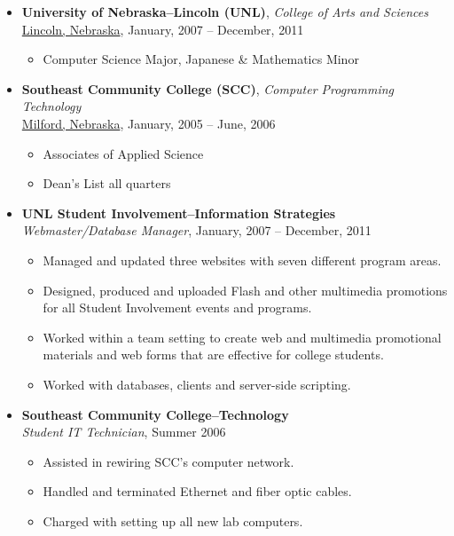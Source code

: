 \documentclass[12pt]{report}
\begin{document}
\begin{center}
\noindent\parbox{6.5in}{{\small

\begin{itemize}
\item\textbf{University of Nebraska--Lincoln (UNL)}, \textit{College of Arts and Sciences}\\
\underline{Lincoln, Nebraska}, January, 2007 -- December, 2011
\begin{itemize}
\item Computer Science Major, Japanese \& Mathematics Minor
\end{itemize}
\item\textbf{Southeast Community College (SCC)}, \textit{Computer Programming Technology}\\
\underline{Milford, Nebraska}, January, 2005 -- June, 2006
\begin{itemize}
\item Associates of Applied Science
\item Dean's List all quarters
\end{itemize}
\end{itemize}

\begin{itemize}
\item\textbf{UNL Student Involvement--Information Strategies}\\
\textit{Webmaster/Database Manager}, January, 2007 -- December, 2011
\begin{itemize}
\item Managed and updated three websites with seven different program areas.
\item Designed, produced and uploaded Flash and other multimedia promotions for all Student Involvement events and programs.
\item Worked within a team setting to create web and multimedia promotional materials and web forms that are effective for college students.
\item Worked with databases, clients and server-side scripting.
\end{itemize}
\item\textbf{Southeast Community College--Technology}\\
\textit{Student IT Technician}, Summer 2006
\begin{itemize}
\item Assisted in rewiring SCC's computer network.
\item Handled and terminated Ethernet and fiber optic cables.
\item Charged with setting up all new lab computers.
\end{itemize}
\end{itemize}

}}
\end{center}
\end{document}
